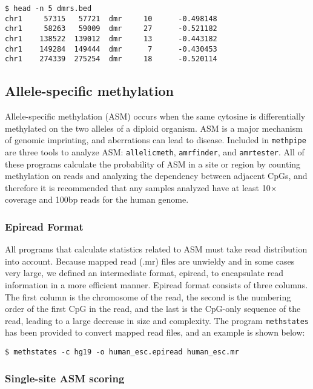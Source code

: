 \documentclass[10pt]{article}
\newcommand{\prog}[1]{\texttt{#1}}
\begin{document}
{\small{%
\begin{verbatim}
$ head -n 5 dmrs.bed
chr1     57315   57721  dmr     10      -0.498148
chr1     58263   59009  dmr     27      -0.521182
chr1    138522  139012  dmr     13      -0.443182
chr1    149284  149444  dmr      7      -0.430453
chr1    274339  275254  dmr     18      -0.520114
\end{verbatim}%

\subsection{Allele-specific methylation}

Allele-specific methylation (ASM) occurs when the same cytosine is
differentially methylated on the two alleles of a diploid organism.
ASM is a major mechanism of genomic imprinting, and aberrations can
lead to disease. Included in \prog{methpipe} are three tools to
analyze ASM: \prog{allelicmeth}, \prog{amrfinder}, and \prog{amrtester}.
All of these programs calculate the probability of ASM in a site or
region by counting methylation on reads and analyzing the dependency
between adjacent CpGs, and therefore it is recommended that any samples
analyzed have at least 10$\times$ coverage and 100bp reads for the human
genome.

\subsubsection{Epiread Format}

All programs that calculate statistics related to ASM must take read
distribution into account. Because mapped read (.mr) files are unwieldy
and in some cases very large, we defined an intermediate format, epiread,
to encapsulate read information in a more efficient manner. Epiread format
consists of three columns. The first column is the chromosome of the read,
the second is the numbering order of the first CpG in the read, and the
last is the CpG-only sequence of the read, leading to a large decrease in
size and complexity. The program \prog{methstates} has been provided to
convert mapped read files, and an example is shown below:

\begin{verbatim}
$ methstates -c hg19 -o human_esc.epiread human_esc.mr
\end{verbatim}


\subsubsection{Single-site ASM scoring}
\label{sec:allelic_scores}

}}
\end{document}
